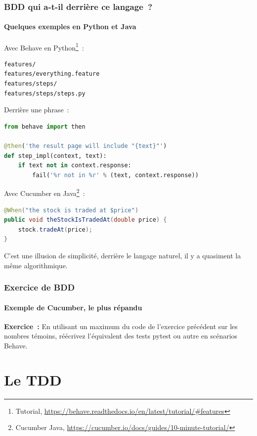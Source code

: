 \documentclass{beamer}
\begin{document}
    \begin{frame}[fragile]
        \frametitle{BDD qui a-t-il derrière ce langage~?}
        \framesubtitle{Quelques exemples en Python et Java}
        \transdissolve
        Avec Behave en Python\footnote{Tutorial, \url{https://behave.readthedocs.io/en/latest/tutorial/\#features}}~:
        \begin{lstlisting}
features/
features/everything.feature
features/steps/
features/steps/steps.py
        \end{lstlisting}
        Derrière une phrase~:
        \begin{lstlisting}[language=Python]
from behave import then

@then('the result page will include "{text}"')
def step_impl(context, text):
    if text not in context.response:
        fail('%r not in %r' % (text, context.response))
        \end{lstlisting}
        Avec Cucumber en Java\footnote{Cucumber Java, \url{https://cucumber.io/docs/guides/10-minute-tutorial/}}~:
        \begin{lstlisting}[language=Java]
@When("the stock is traded at $price")
public void theStockIsTradedAt(double price) {
    stock.tradeAt(price);
}
        \end{lstlisting}
        \bigbreak
        C'est une illusion de simplicité, derrière le langage naturel, il y a quasiment la même algorithmique.
    \end{frame}

    \begin{frame}
        \frametitle{Exercice \execcounterdispinc{} de BDD}
        \framesubtitle{Exemple de Cucumber, le plus répandu}
        \transdissolve
        \textbf{Exercice~:} En utilisant un maximum du code de l'exercice précédent sur les nombres témoins, réécrivez l'équivalent des tests pytest ou autre en scénarios Behave.
    \end{frame}


    \section{Le TDD}\label{sec:le-tdd}
\end{document}
